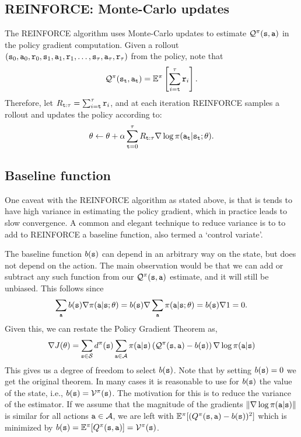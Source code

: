 \subsection{REINFORCE: Monte-Carlo updates}

The REINFORCE algorithm uses Monte-Carlo updates to estimate $\mathcal{Q}^\pi
({\tt s},{\tt a})$ in the policy gradient computation. Given a rollout
$({\tt s}_0,{\tt a}_0,{\tt r}_0,{\tt s}_1,{\tt a}_1,{\tt r}_1, \ldots ,
{\tt s}_\tau,{\tt a}_\tau,{\tt r}_\tau)$ from the policy, note that
\begin{equation*}
    \mathcal{Q}^\pi
({\tt s}_{{\tt t}},{\tt a}_{{\tt t}}) = \mathbb{E}^{\pi}\left[ \sum_{i={\tt t}}^\tau {\tt r}_i \right]. 
\end{equation*}
Therefore, let $R_{{\tt t}:\tau}=\sum_{i={\tt t}}^\tau {\tt r}_i$, and at each iteration REINFORCE samples a rollout and updates the policy according to:
\[
\theta\leftarrow \theta+\alpha \sum_{{\tt t}=0}^{\tau} R_{{\tt t}:\tau} \nabla \log
\pi({\tt a}_{\tt t}|{\tt s}_{\tt t};\theta).
\]

\subsection*{Baseline function}
One caveat with the REINFORCE algorithm as stated above, is that is tends to have high variance in estimating the policy gradient, which in practice leads to slow convergence. A common and elegant technique to reduce variance is to to add to REINFORCE a baseline function, also termed a `control variate'.

The baseline function $b({\tt s})$ can depend in an arbitrary way on
the state, but does not depend on the action. The main observation
would be that we can add or subtract any such function from our
$\mathcal{Q}^\pi
({\tt s},{\tt a})$ estimate, and it will still be unbiased. This follows since
\[
\sum_{\tt a} b({\tt s}) \nabla
\pi({\tt a}|{\tt s};\theta)=b({\tt s})\nabla \sum_{\tt a}
\pi({\tt a}|{\tt s};\theta)=b({\tt s})\nabla 1=0.
\]
Given this, we can restate the Policy Gradient Theorem as,
\[
\nabla J(\theta) = \sum_{{\tt s} \in \mathcal{S}} d^{\pi}({\tt s}) \sum_{{\tt a}\in
\mathcal{A}} \pi({\tt a}|{\tt s}) \left(\mathcal{Q}^\pi
({\tt s},{\tt a}) - b({\tt s})\right)\nabla \log \pi({\tt a}|{\tt s})
\]
This gives us a degree of freedom to select $b({\tt s})$. Note that
by setting $b({\tt s})=0$ we get the original theorem. In many cases
it is reasonable to use for $b({\tt s})$ the value of the state,
i.e., $b({\tt s})=\mathcal{V}^\pi({\tt s})$. The motivation for this is
to reduce the variance of the estimator. If we assume that the
magnitude of the gradients $\|\nabla
\log \pi({\tt a}|{\tt s})\|$ is similar for all actions
${\tt a}\in \mathcal{A}$, we are left with $\mathbb{E}^\pi
[(Q^\pi({\tt s},{\tt a})-b({\tt s}))^2]$ which is minimized by
$b({\tt s})=\mathbb{E}^\pi[Q^\pi({\tt s},{\tt a})]=\mathcal{V}^\pi({\tt s})$.

